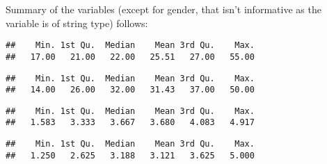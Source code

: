 \documentclass[
]{article}
\newenvironment{Shaded}{\begin{snugshade}}{\end{snugshade}}
\newcommand{\KeywordTok}[1]{\textcolor[rgb]{0.13,0.29,0.53}{\textbf{#1}}}
\newcommand{\NormalTok}[1]{#1}
\newcommand{\OperatorTok}[1]{\textcolor[rgb]{0.81,0.36,0.00}{\textbf{#1}}}
\begin{document}
Summary of the variables (except for gender, that isn't informative as
the variable is of string type) follows:

\begin{Shaded}
\end{Shaded}

\begin{verbatim}
##    Min. 1st Qu.  Median    Mean 3rd Qu.    Max. 
##   17.00   21.00   22.00   25.51   27.00   55.00
\end{verbatim}

\begin{Shaded}
\end{Shaded}

\begin{verbatim}
##    Min. 1st Qu.  Median    Mean 3rd Qu.    Max. 
##   14.00   26.00   32.00   31.43   37.00   50.00
\end{verbatim}

\begin{Shaded}
\end{Shaded}

\begin{verbatim}
##    Min. 1st Qu.  Median    Mean 3rd Qu.    Max. 
##   1.583   3.333   3.667   3.680   4.083   4.917
\end{verbatim}

\begin{Shaded}
\end{Shaded}

\begin{verbatim}
##    Min. 1st Qu.  Median    Mean 3rd Qu.    Max. 
##   1.250   2.625   3.188   3.121   3.625   5.000
\end{verbatim}

\begin{Shaded}
\end{Shaded}
\end{document}
